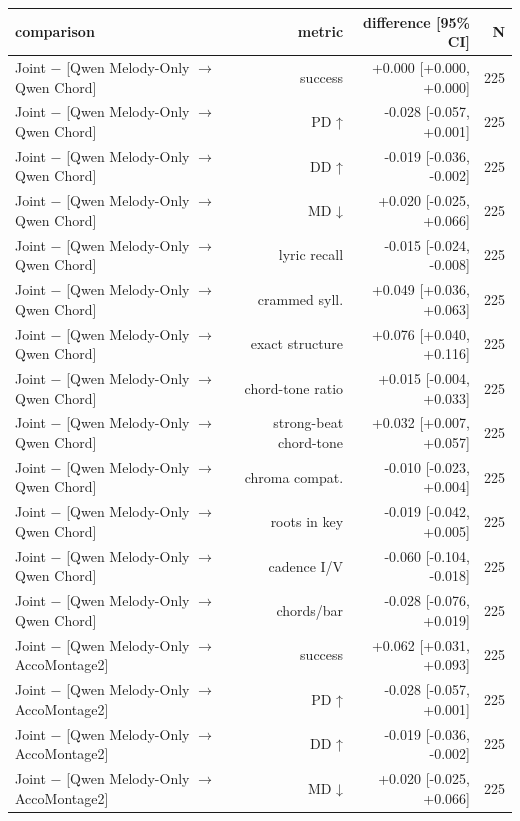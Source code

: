 \begin{table}[t]
\centering
\small
\begin{tabular}{lrrr}
\toprule
comparison & metric & difference [95\% CI] & N \\
\midrule
Joint $-$ [Qwen Melody-Only $\rightarrow$ Qwen Chord] & success & +0.000 [+0.000, +0.000] & 225 \\
Joint $-$ [Qwen Melody-Only $\rightarrow$ Qwen Chord] & PD ↑ & -0.028 [-0.057, +0.001] & 225 \\
Joint $-$ [Qwen Melody-Only $\rightarrow$ Qwen Chord] & DD ↑ & -0.019 [-0.036, -0.002] & 225 \\
Joint $-$ [Qwen Melody-Only $\rightarrow$ Qwen Chord] & MD ↓ & +0.020 [-0.025, +0.066] & 225 \\
Joint $-$ [Qwen Melody-Only $\rightarrow$ Qwen Chord] & lyric recall & -0.015 [-0.024, -0.008] & 225 \\
Joint $-$ [Qwen Melody-Only $\rightarrow$ Qwen Chord] & crammed syll. & +0.049 [+0.036, +0.063] & 225 \\
Joint $-$ [Qwen Melody-Only $\rightarrow$ Qwen Chord] & exact structure & +0.076 [+0.040, +0.116] & 225 \\
Joint $-$ [Qwen Melody-Only $\rightarrow$ Qwen Chord] & chord-tone ratio & +0.015 [-0.004, +0.033] & 225 \\
Joint $-$ [Qwen Melody-Only $\rightarrow$ Qwen Chord] & strong-beat chord-tone & +0.032 [+0.007, +0.057] & 225 \\
Joint $-$ [Qwen Melody-Only $\rightarrow$ Qwen Chord] & chroma compat. & -0.010 [-0.023, +0.004] & 225 \\
Joint $-$ [Qwen Melody-Only $\rightarrow$ Qwen Chord] & roots in key & -0.019 [-0.042, +0.005] & 225 \\
Joint $-$ [Qwen Melody-Only $\rightarrow$ Qwen Chord] & cadence I/V & -0.060 [-0.104, -0.018] & 225 \\
Joint $-$ [Qwen Melody-Only $\rightarrow$ Qwen Chord] & chords/bar & -0.028 [-0.076, +0.019] & 225 \\
Joint $-$ [Qwen Melody-Only $\rightarrow$ AccoMontage2] & success & +0.062 [+0.031, +0.093] & 225 \\
Joint $-$ [Qwen Melody-Only $\rightarrow$ AccoMontage2] & PD ↑ & -0.028 [-0.057, +0.001] & 225 \\
Joint $-$ [Qwen Melody-Only $\rightarrow$ AccoMontage2] & DD ↑ & -0.019 [-0.036, -0.002] & 225 \\
Joint $-$ [Qwen Melody-Only $\rightarrow$ AccoMontage2] & MD ↓ & +0.020 [-0.025, +0.066] & 225 \\

\end{tabular}
\end{table}
